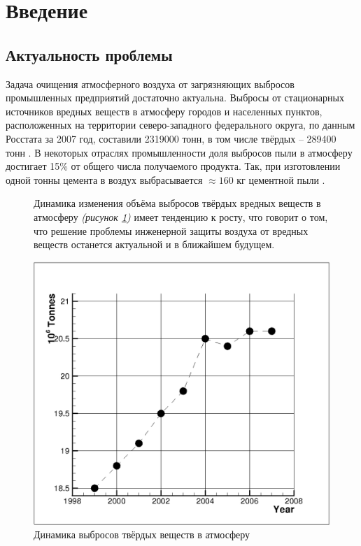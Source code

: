 \section*{Введение}
	\subsection*{Актуальность проблемы}
		\hspace{1em} 	Задача очищения атмосферного воздуха от загрязняющих выбросов промышленных предприятий достаточно актуальна. Выбросы от стационарных источников вредных веществ в атмосферу городов и населенных пунктов, расположенных на территории северо-западного федерального округа,  по данным Росстата за 2007 год,  составили 2319000 тонн, в том числе твёрдых -- 289400 тонн \cite{emissionInfoRussian}. В некоторых отраслях промышленности доля выбросов пыли в атмосферу достигает 15\% от общего числа получаемого продукта. Так, при изготовлении одной тонны цемента в воздух выбрасывается $\approx 160$ кг цементной пыли \cite{emissionInfoEurope}.
		\begin{figure}[ht]
			\begin{minipage}{0.46\linewidth}
				\vspace{-1em}
				Динамика изменения объёма выбросов твёрдых вредных веществ в атмосферу \textit{(рисунок \ref{figure:atmosphereDynamic})} имеет тенденцию к росту, что говорит о том, что решение проблемы инженерной защиты воздуха от вредных веществ останется актуальной и в ближайшем будущем. 
			\end{minipage}
			\hspace{0.01\linewidth}
			\begin{minipage}{0.48\linewidth}
				\centering
				\includegraphics[scale=0.28]{atmosphereDynamic1}
				\caption{Динамика выбросов твёрдых веществ в атмосферу \cite{emissionInfoRussian}}
				\label{figure:atmosphereDynamic}
			\end{minipage}
		\end{figure}
		\vspace{-1em}
	

